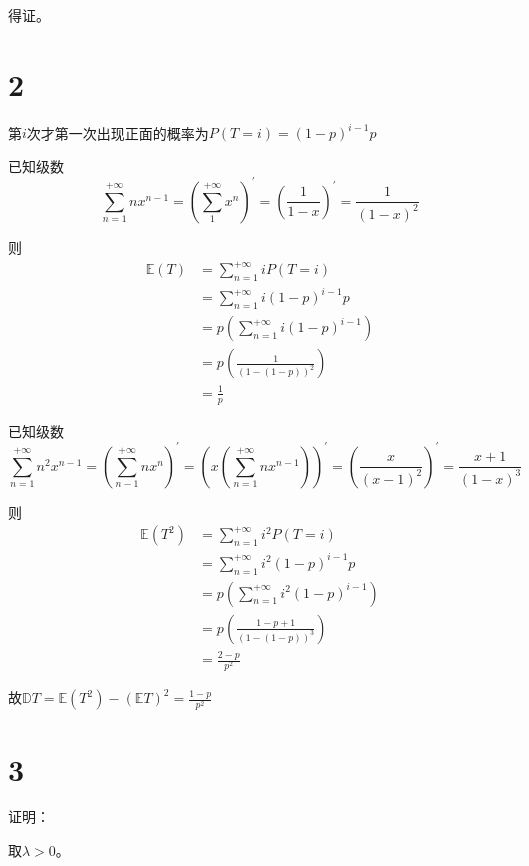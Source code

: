 \documentclass{article}
\begin{document}
得证。

\clearpage
\section*{2}
第$i$次才第一次出现正面的概率为$P(T=i) = (1-p)^{i-1}p$

已知级数$$\sum_{n=1}^{+\infty} nx^{n-1}=(\sum_{1}^{+\infty}x^n)^{'}=(\frac{1}{1-x})^{'}=\frac{1}{(1-x)^2}$$

则
\begin{equation*}
\begin{split}
\mathbb{E}(T)&=\sum_{n=1}^{+\infty}iP(T=i)\\
&=\sum_{n=1}^{+\infty} i(1-p)^{i-1}p\\
&=p(\sum_{n=1}^{+\infty} i(1-p)^{i-1})\\
&=p(\frac{1}{(1-(1-p))^2})\\
&=\frac{1}{p}
\end{split}
\end{equation*}

已知级数
$$\sum_{n=1}^{+\infty}n^2x^{n-1}=(\sum_{n-1}^{+\infty}nx^n)^{'}=(x(\sum_{n=1}^{+\infty}nx^{n-1}))^{'}=(\frac{x}{(x-1)^2})^{'}=\frac{x+1}{(1-x)^3}$$

则
\begin{equation*}
\begin{split}
\mathbb{E}(T^2)&=\sum_{n=1}^{+\infty}i^2P(T=i)\\
&=\sum_{n=1}^{+\infty} i^2(1-p)^{i-1}p\\
&=p(\sum_{n=1}^{+\infty} i^2(1-p)^{i-1})\\
&=p(\frac{1-p+1}{(1-(1-p))^3})\\
&=\frac{2-p}{p^2}
\end{split}
\end{equation*}

故$\mathbb{D}T=\mathbb{E}(T^2)-(\mathbb{E}T)^2=\frac{1-p}{p^2}$

\clearpage
\section*{3}
证明：

取$\lambda>0$。
\end{document}
